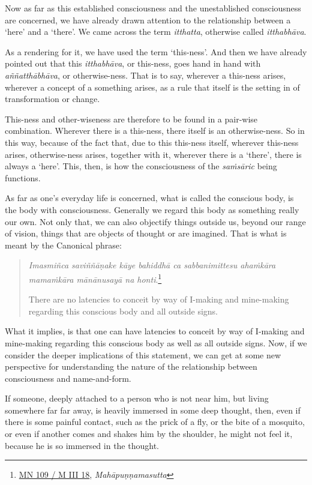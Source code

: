 Now as far as this established consciousness and the unestablished consciousness are concerned, we have already drawn attention to the relationship between a `here' and a `there'. We came across the term \emph{itthatta}, otherwise called \emph{itthabhāva}.

As a rendering for it, we have used the term `this-ness'. And then we have already pointed out that this \emph{itthabhāva}, or this-ness, goes hand in hand with \emph{aññatthābhāva}, or otherwise-ness. That is to say, wherever a this-ness arises, wherever a concept of a something arises, as a rule that itself is the setting in of transformation or change.

This-ness and other-wiseness are therefore to be found in a pair-wise combination. Wherever there is a this-ness, there itself is an otherwise-ness. So in this way, because of the fact that, due to this this-ness itself, wherever this-ness arises, otherwise-ness arises, together with it, wherever there is a `there', there is always a `here'. This, then, is how the consciousness of the \emph{saṁsāric} being functions.

As far as one's everyday life is concerned, what is called the conscious body, is the body with consciousness. Generally we regard this body as something really our own. Not only that, we can also objectify things outside us, beyond our range of vision, things that are objects of thought or are imagined. That is what is meant by the Canonical phrase:

\begin{quote}
\emph{Imasmiñca saviññāṇake kāye bahiddhā ca sabbanimittesu ahaṁkāra mamaṁkāra mānānusayā na honti}.\footnote{\href{https://suttacentral.net/mn109/pli/ms}{MN 109 / M III 18}, \emph{Mahāpuṇṇamasutta}}

There are no latencies to conceit by way of I-making and mine-making regarding this conscious body and all outside signs.
\end{quote}

What it implies, is that one can have latencies to conceit by way of I-making and mine-making regarding this conscious body as well as all outside signs. Now, if we consider the deeper implications of this statement, we can get at some new perspective for understanding the nature of the relationship between consciousness and name-and-form.

If someone, deeply attached to a person who is not near him, but living somewhere far far away, is heavily immersed in some deep thought, then, even if there is some painful contact, such as the prick of a fly, or the bite of a mosquito, or even if another comes and shakes him by the shoulder, he might not feel it, because he is so immersed in the thought.

